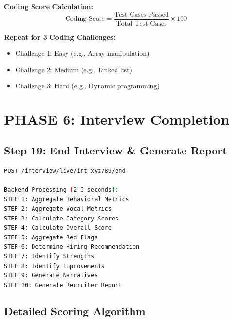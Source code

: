 \documentclass[12pt,a4paper]{article}
\begin{document}
\textbf{Coding Score Calculation:}
\begin{equation}
\text{Coding Score} = \frac{\text{Test Cases Passed}}{\text{Total Test Cases}} \times 100
\end{equation}

\textbf{Repeat for 3 Coding Challenges:}
\begin{itemize}
    \item Challenge 1: Easy (e.g., Array manipulation)
    \item Challenge 2: Medium (e.g., Linked list)
    \item Challenge 3: Hard (e.g., Dynamic programming)
\end{itemize}

\newpage

\section{PHASE 6: Interview Completion}

\subsection{Step 19: End Interview \& Generate Report}

\begin{lstlisting}[language=bash, caption=End Interview API]
POST /interview/live/int_xyz789/end

Backend Processing (2-3 seconds):
STEP 1: Aggregate Behavioral Metrics
STEP 2: Aggregate Vocal Metrics
STEP 3: Calculate Category Scores
STEP 4: Calculate Overall Score
STEP 5: Aggregate Red Flags
STEP 6: Determine Hiring Recommendation
STEP 7: Identify Strengths
STEP 8: Identify Improvements
STEP 9: Generate Narratives
STEP 10: Generate Recruiter Report
\end{lstlisting}

\subsection{Detailed Scoring Algorithm}
\end{document}
